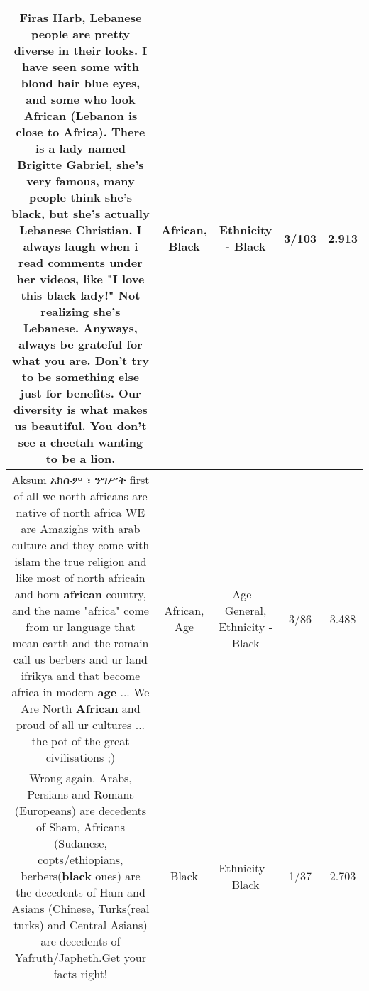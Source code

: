 \documentclass[11pt]{article}
\newlength\mylength
\begin{document}
\begin{center}
\begin{longtable}{|C{.65\mylength}|C{.30\mylength}|C{.12\mylength}|C{.12\mylength}|C{.12\mylength}|}
  \small Firas Harb, Lebanese people are pretty diverse in their looks. I have seen some with blond hair blue eyes, and some who look \textbf{African} (Lebanon is close to Africa). There is a lady named Brigitte Gabriel, she's very famous, many people think she's \textbf{black}, but she's actually Lebanese Christian. I always laugh when i read comments under her videos, like "I love this \textbf{black} lady!" Not realizing she's Lebanese. Anyways, always be grateful for what you are. Don't try to be something else just for benefits. Our diversity is what makes us beautiful. You don't see a cheetah wanting to be a lion.\normalsize   & African, Black & Ethnicity - Black & 3/103 & 2.913 \\  \hline
  \small Aksum አክሱም ፣ ንግሥት first of all we north africans are native of north africa WE are Amazighs with arab culture and they come with islam the true religion and like most of north africain and horn \textbf{african} country, and the name "africa" come from ur language that mean earth and the romain call us berbers and ur land ifrikya and that become africa in modern \textbf{age} ... We Are North \textbf{African} and proud of all ur cultures ... the pot of the great civilisations ;)\normalsize   & African, Age & Age - General, Ethnicity - Black & 3/86 & 3.488 \\  \hline
  \small Wrong again. Arabs, Persians and Romans (Europeans) are decedents of Sham, Africans (Sudanese, copts/ethiopians, berbers(\textbf{black} ones) are the decedents of Ham and Asians (Chinese, Turks(real turks) and Central Asians) are decedents of Yafruth/Japheth.Get your facts right!\normalsize   & Black & Ethnicity - Black & 1/37 & 2.703 \\  \hline

\end{longtable}
\end{center}
\end{document}
